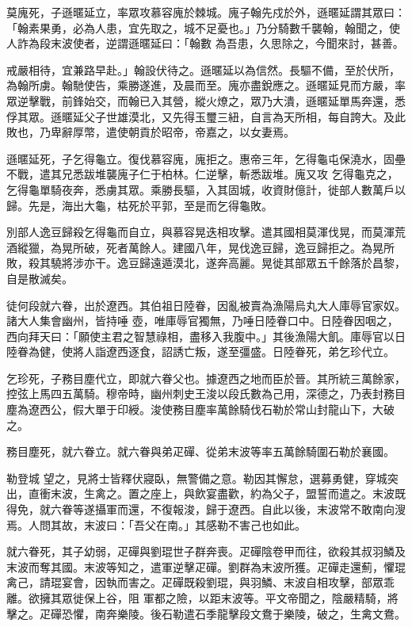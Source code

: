 \begin{pinyinscope}
 莫廆死，子遜暱延立，率眾攻慕容廆於棘城。廆子翰先戍於外，遜暱延謂其眾曰：「翰素果勇，必為人患，宜先取之，城不足憂也。」乃分騎數千襲翰，翰聞之，使人詐為段末波使者，逆謂遜暱延曰：「翰數
 為吾患，久思除之，今聞來討，甚善。



 戒嚴相待，宜兼路早赴。」翰設伏待之。遜暱延以為信然。長驅不備，至於伏所，為翰所虜。翰馳使告，乘勝遂進，及晨而至。廆亦盡銳應之。遜暱延見而方嚴，率眾逆擊戰，前鋒始交，而翰已入其營，縱火燎之，眾乃大潰，遜暱延單馬奔還，悉俘其眾。遜暱延父子世雄漠北，又先得玉璽三紐，自言為天所相，每自誇大。及此敗也，乃卑辭厚幣，遣使朝貢於昭帝，帝嘉之，以女妻焉。



 遜暱延死，子乞得龜立。復伐慕容廆，廆拒之。惠帝三年，乞得龜屯保澆水，固壘不戰，遣其兄悉跋堆襲廆子仁于柏林。仁逆擊，斬悉跋堆。廆又攻
 乞得龜克之，乞得龜單騎夜奔，悉虜其眾。乘勝長驅，入其固城，收資財億計，徙部人數萬戶以歸。先是，海出大龜，枯死於平郭，至是而乞得龜敗。



 別部人逸豆歸殺乞得龜而自立，與慕容晃迭相攻擊。遣其國相莫渾伐晃，而莫渾荒酒縱獵，為晃所破，死者萬餘人。建國八年，晃伐逸豆歸，逸豆歸拒之。為晃所敗，殺其驍將涉亦干。逸豆歸遠遁漠北，遂奔高麗。晃徙其部眾五千餘落於昌黎，自是散滅矣。



 徒何段就六眷，出於遼西。其伯祖日陸眷，因亂被賣為漁陽烏丸大人庫辱官家奴。諸大人集會幽州，皆持唾
 壺，唯庫辱官獨無，乃唾日陸眷口中。日陸眷因咽之，西向拜天曰：「願使主君之智慧祿相，盡移入我腹中。」其後漁陽大飢。庫辱官以日陸眷為健，使將人詣遼西逐食，詔誘亡叛，遂至彊盛。日陸眷死，弟乞珍代立。



 乞珍死，子務目塵代立，即就六眷父也。據遼西之地而臣於晉。其所統三萬餘家，控弦上馬四五萬騎。穆帝時，幽州刺史王浚以段氏數為己用，深德之，乃表封務目塵為遼西公，假大單于印綬。浚使務目塵率萬餘騎伐石勒於常山封龍山下，大破之。



 務目塵死，就六眷立。就六眷與弟疋磾、從弟末波等率五萬餘騎圍石勒於襄國。



 勒登城
 望之，見將士皆釋伏寢臥，無警備之意。勒因其懈怠，選募勇健，穿城突出，直衝末波，生禽之。置之座上，與飲宴盡歡，約為父子，盟誓而遣之。末波既得免，就六眷等遂攝軍而還，不復報浚，歸于遼西。自此以後，末波常不敢南向溲焉。人問其故，末波曰：「吾父在南。」其感勒不害己也如此。



 就六眷死，其子幼弱，疋磾與劉琨世子群奔喪。疋磾陰卷甲而往，欲殺其叔羽鱗及末波而奪其國。末波等知之，遣軍逆擊疋磾。劉群為末波所獲。疋磾走還薊，懼琨禽己，請琨宴會，因執而害之。疋磾既殺劉琨，與羽鱗、末波自相攻擊，部眾乖離。欲擁其眾徙保上谷，阻
 軍都之險，以距末波等。平文帝聞之，陰嚴精騎，將擊之。疋磾恐懼，南奔樂陵。後石勒遣石季龍擊段文鴦于樂陵，破之，生禽文鴦。




\end{pinyinscope}
